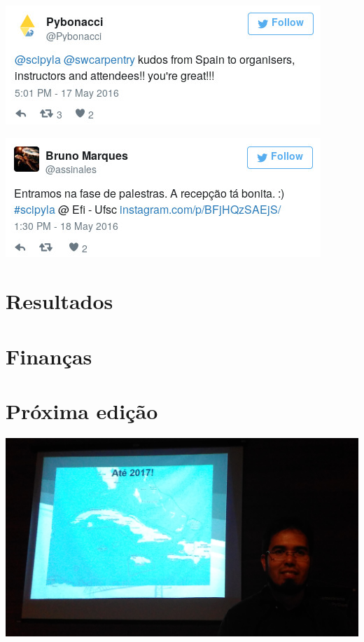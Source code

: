 \documentclass[12pt]{article}
\begin{document}
\noindent  %
\includegraphics[width=\textwidth]{tweet-kudos.jpg}

\noindent  %
\includegraphics[width=\textwidth]{tweet-recepcao.jpg}

\newpage

\section*{Resultados}

\newpage

\section*{Finanças}

\newpage

\section*{Próxima edição}

\noindent  %
\includegraphics[width=\textwidth]{2017.jpg}
\end{document}
